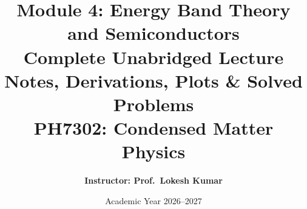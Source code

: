 \documentclass[11pt,a4paper]{article}
\begin{document}
\title{%
    \vspace{-1.2cm}
    \textbf{\LARGE Module 4: Energy Band Theory and Semiconductors}\\[0.35cm]
    \Large Complete Unabridged Lecture Notes, Derivations, Plots \& Solved Problems\\[0.25cm]
    \large\color{blue!65!black}\textbf{PH7302: Condensed Matter Physics}
}
\author{%
    \textbf{Instructor: Prof.~Lokesh Kumar}\\[0.15cm]
}
\date{Academic Year 2026--2027}
\maketitle
\thispagestyle{plain}
\end{document}
